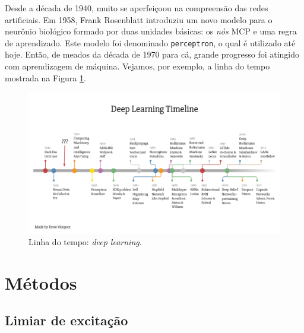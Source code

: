 \documentclass[10pt,journal,compsoc]{IEEEtran}
\begin{document}
Desde a década de 1940, muito se aperfeiçoou na compreensão 
das redes artificiais. Em 1958, Frank Rosenblatt introduziu 
um novo modelo para o neurônio biológico formado por duas
unidades básicas: os \emph{nós} MCP e uma regra de aprendizado.
Este modelo foi denominado \texttt{perceptron}, o qual é utilizado
até hoje. Então, de meados da década de 1970 para cá, grande
progresso foi atingido com aprendizagem de máquina. 
Vejamos, por exemplo, a linha do tempo mostrada na 
Figura \ref{fig:historico}. 
\begin{figure}[t!]
  \centering
  \includegraphics[scale=0.4,trim={1cm 3cm 1cm 5cm},clip]{figs/2timeline.png}
  \caption{Linha do tempo: \textit{deep learning}.}
  \label{fig:historico}
\end{figure}

\section{Métodos}
\label{sec:metodos}

\subsection{Limiar de excitação}
\end{document}
